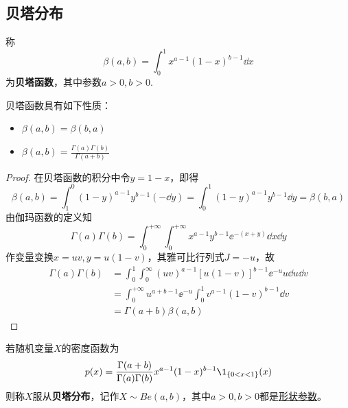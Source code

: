 \begin{proposition}
\end{proposition}

\subsection{贝塔分布}

\begin{definition}
    称
    \[ \beta(a,b) = \int_0^1 x^{a-1}(1-x)^{b-1}\dd x \]
    为\textbf{贝塔函数}，其中参数$a>0,b>0$.
\end{definition}

\begin{proposition}
    贝塔函数具有如下性质：
    \begin{itemize}
        \item $\beta(a,b)=\beta(b,a)$
        \item $\beta(a,b) = \frac{\Gamma(a)\Gamma(b)}{\Gamma(a+b)}$
    \end{itemize}
\end{proposition}
\begin{proof}
    在贝塔函数的积分中令$y=1-x$，即得
    \[ \beta(a,b) = \int_1^0(1-y)^{a-1}y^{b-1}(-\dd y) = \int_0^1 (1-y)^{a-1}y^{b-1}\dd y = \beta(b,a) \]
    由伽玛函数的定义知
    \[ \Gamma(a) \Gamma(b) = \int_0^{+\infty}\int_0^{+\infty}x^{a-1}y^{b-1}  \ee^{-(x+y)} \dd x \dd y \]
    作变量变换$x=uv,y=u(1-v)$，其雅可比行列式$J=-u$，故
    \begin{align*}
        \Gamma(a)\Gamma(b) & = \int_0^1 \int_0^{\infty} (uv)^{a-1}[u(1-v)]^{b-1}\ee^{-u}u \dd u \dd v \\
                           & = \int_0^{+\infty}u^{a+b-1}\ee^{-u} \int_0^1v^{a-1}(1-v)^{b-1}\dd v      \\
                           & = \Gamma(a+b)\beta(a,b)
    \end{align*}
\end{proof}

\begin{definition}
    若随机变量$X$的密度函数为
    \[ p(x) = \frac{\Gamma(a+b)}{\Gamma(a)\Gamma(b)}            x^{a-1}(1-x)^{b-1}\1_{\{0< x < 1 \}}(x) \]
    则称$X$服从\textbf{贝塔分布}，记作$X\sim Be(a,b)$，其中$a>0,b>0$都是\underline{形状参数}。
\end{definition}

